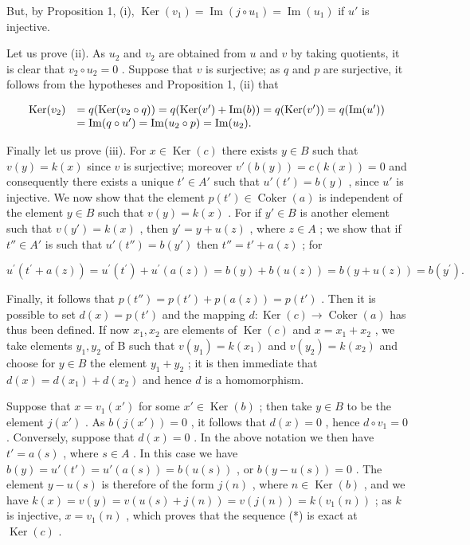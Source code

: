 But, by Proposition 1, (i), \(\operatorname{Ker}(v_1) = \operatorname{Im}(j \circ u_1) = \operatorname{Im}(u_1)\) if \(u'\) is injective.

Let us prove (ii). As \(u_{2}\) and \(v_{2}\) are obtained from \(u\) and \(v\) by taking quotients, it is clear that \(v_{2} \circ u_{2} = 0\) . Suppose that \(v\) is surjective; as \(q\) and \(p\) are surjective, it follows from the hypotheses and Proposition 1, (ii) that

\[
\begin{array}{r l} \operatorname{Ker} (v _ {2}) & = q (\operatorname{Ker} (v _ {2} \circ q)) = q (\operatorname{Ker} (v ^ {\prime}) + \operatorname{Im} (b)) = q (\operatorname{Ker} (v ^ {\prime})) = q (\operatorname{Im} (u ^ {\prime})) \\ & = \operatorname{Im} (q \circ u ^ {\prime}) = \operatorname{Im} (u _ {2} \circ p) = \operatorname{Im} (u _ {2}). \end{array}
\]

Finally let us prove (iii). For \(x \in \operatorname{Ker}(c)\) there exists \(y \in B\) such that \(v(y) = k(x)\) since \(v\) is surjective; moreover \(v'(b(y)) = c(k(x)) = 0\) and consequently there exists a unique \(t' \in A'\) such that \(u'(t') = b(y)\) , since \(u'\) is injective. We now show that the element \(p(t') \in \operatorname{Coker}(a)\) is independent of the element \(y \in B\) such that \(v(y) = k(x)\) . For if \(y' \in B\) is another element such that \(v(y') = k(x)\) , then \(y' = y + u(z)\) , where \(z \in A\) ; we show that if \(t'' \in A'\) is such that \(u'(t'') = b(y')\) then \(t'' = t' + a(z)\) ; for

\[
u ^ {\prime} \left(t ^ {\prime} + a (z)\right) = u ^ {\prime} \left(t ^ {\prime}\right) + u ^ {\prime} (a (z)) = b (y) + b (u (z)) = b (y + u (z)) = b \left(y ^ {\prime}\right).
\]

Finally, it follows that \(p(t'') = p(t') + p(a(z)) = p(t')\) . Then it is possible to set \(d(x) = p(t')\) and the mapping \(d: \operatorname{Ker}(c) \to \operatorname{Coker}(a)\) has thus been defined. If now \(x_1, x_2\) are elements of \(\operatorname{Ker}(c)\) and \(x = x_1 + x_2\) , we take elements \(y_1, y_2\) of B such that \(v(y_1) = k(x_1)\) and \(v(y_2) = k(x_2)\) and choose for \(y \in B\) the element \(y_1 + y_2\) ; it is then immediate that \(d(x) = d(x_1) + d(x_2)\) and hence \(d\) is a homomorphism.

Suppose that \(x = v_{1}(x')\) for some \(x' \in \operatorname{Ker}(b)\) ; then take \(y \in B\) to be the element \(j(x')\) . As \(b(j(x')) = 0\) , it follows that \(d(x) = 0\) , hence \(d \circ v_{1} = 0\) . Conversely, suppose that \(d(x) = 0\) . In the above notation we then have \(t' = a(s)\) , where \(s \in A\) . In this case we have \(b(y) = u'(t') = u'(a(s)) = b(u(s))\) , or \(b(y - u(s)) = 0\) . The element \(y - u(s)\) is therefore of the form \(j(n)\) , where \(n \in \operatorname{Ker}(b)\) , and we have \(k(x) = v(y) = v(u(s) + j(n)) = v(j(n)) = k(v_1(n))\) ; as \(k\) is injective, \(x = v_1(n)\) , which proves that the sequence (*) is exact at \(\operatorname{Ker}(c)\) .

